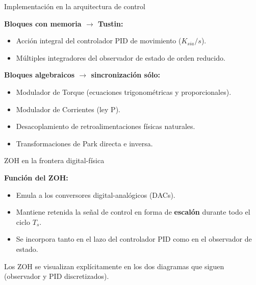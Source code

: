 \documentclass[aspectratio=169,t]{beamer}
\begin{document}
\begin{frame}{Implementación en la arquitectura de control}
\vspace{4mm}

\textbf{Bloques con memoria $\to$ Tustin:}
\begin{itemize}
\item Acción integral del controlador PID de movimiento ($K_{sia}/s$).
\item Múltiples integradores del observador de estado de orden reducido.
\end{itemize}

\vspace{3mm}
\textbf{Bloques algebraicos $\to$ sincronización sólo:}
\begin{itemize}
\item Modulador de Torque (ecuaciones trigonométricas y proporcionales).
\item Modulador de Corrientes (ley P).
\item Desacoplamiento de retroalimentaciones físicas naturales.
\item Transformaciones de Park directa e inversa.
\end{itemize}
\end{frame}

\begin{frame}{ZOH en la frontera digital-física}
\vspace{10mm}

\textbf{Función del ZOH:}
\begin{itemize}
\item Emula a los conversores digital-analógicos (DACs).
\item Mantiene retenida la señal de control en forma de \textbf{escalón} durante todo el ciclo $T_s$.
\item Se incorpora tanto en el lazo del controlador PID como en el observador de estado.
\end{itemize}

\vspace{8mm}
{\small Los ZOH se visualizan explícitamente en los dos diagramas que siguen (observador y PID discretizados).}
\end{frame}
\end{document}
